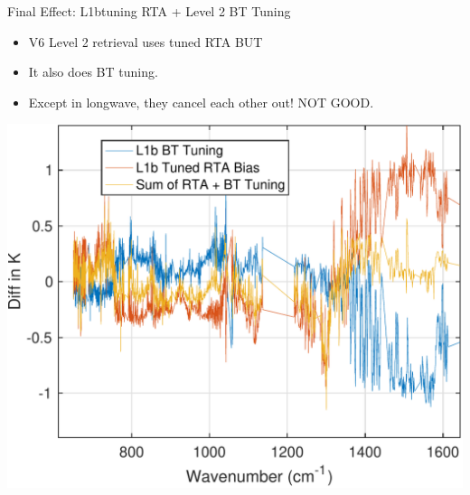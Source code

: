 \documentclass[10pt,t]{beamer}
\begin{document}
\begin{frame}[label={sec:orgcfca8da}]{Final Effect: L1btuning RTA + Level 2 BT Tuning}
\begin{itemize}
\item V6 Level 2 retrieval uses tuned RTA \alert{BUT}
\item It also does BT tuning.
\item Except in longwave, they cancel each other out!  NOT GOOD.
\end{itemize}
\begin{center}
\includegraphics[width=0.65\linewidth]{./Talk2/l1b_bttuning_l1b_tunedbias_added.pdf}
\end{center}
\end{frame}








    
    

\end{document}
